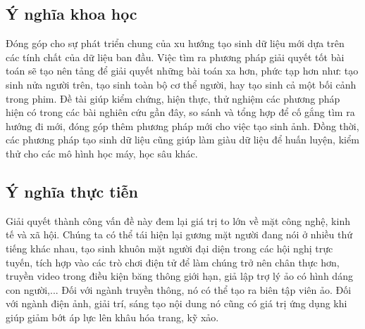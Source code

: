\subsection{\texorpdfstring{Ý nghĩa khoa học}{ScientificMeaning}}
Đóng góp cho sự phát triển chung của xu hướng tạo sinh dữ liệu mới dựa trên các tính chất của dữ liệu ban đầu. Việc tìm ra phương pháp giải quyết tốt bài toán sẽ tạo nên tảng để giải quyết những bài toán xa hơn, phức tạp hơn như: tạo sinh nửa người trên, tạo sinh toàn bộ cơ thể người, hay tạo sinh cả một bối cảnh trong phim. Đề tài giúp kiểm chứng, hiện thực, thử nghiệm các phương pháp hiện có trong các bài nghiên cứu gần đây, so sánh và tổng hợp để cố gắng tìm ra hướng đi mới, đóng góp thêm phương pháp mới cho việc tạo sinh ảnh. Đồng thời, các phương pháp tạo sinh dữ liệu cũng giúp làm giàu dữ liệu để huấn luyện, kiểm thử cho các mô hình học máy, học sâu khác.

\subsection{\texorpdfstring{Ý nghĩa thực tiễn}{RealLifeMeaning}}
Giải quyết thành công vấn đề này đem lại giá trị to lớn về mặt công nghệ, kinh tế và xã hội. Chúng ta có thể tái hiện lại gương mặt người đang nói ở nhiều thứ tiếng khác nhau, tạo sinh khuôn mặt người đại diện trong các hội nghị trực tuyến, tích hợp vào các trò chơi điện tử để làm chúng trở nên chân thực hơn, truyền video trong điều kiện băng thông giới hạn, giả lập trợ lý ảo có hình dáng con người,... Đối với ngành truyền thông, nó có thể tạo ra biên tập viên ảo. Đối với ngành điện ảnh, giải trí, sáng tạo nội dung nó cũng có giá trị ứng dụng khi giúp giảm bớt áp lực lên khâu hóa trang, kỹ xảo.
